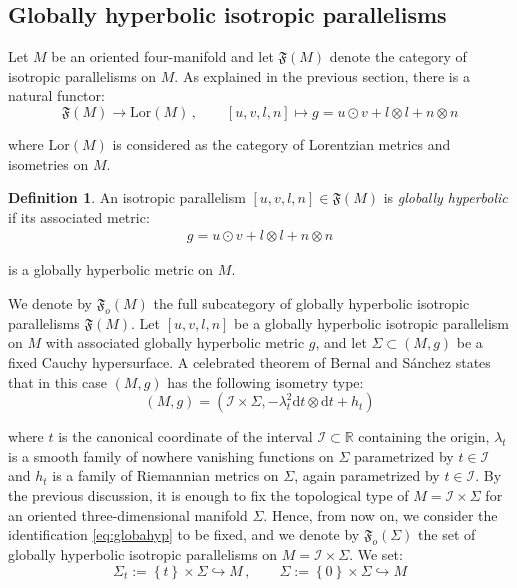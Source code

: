 \documentclass[10pt,reqno,a4paper]{amsart}
\theoremstyle{plain}
\theoremstyle{definition}
\newtheorem{definition}[thm]{Definition}
\theoremstyle{remark}
\theoremstyle{remark}
\def\dd{\mathrm{d}}
\def\cI{\mathcal{I}}
\renewcommand{\(}{ (}
\renewcommand{\)}{ )}
\begin{document}
%
%
%
%
 
 
%
%

\subsection{Globally hyperbolic isotropic parallelisms}
\label{sec:ReductionGloballyHyperbolicparallelisms}

%
%

Let $M$ be an oriented four-manifold and let $\mathfrak{F}(M)$ denote the category of isotropic parallelisms on $M$. As explained in the previous section, there is a natural functor:
\begin{equation*}
\mathfrak{F}(M) \to \mathrm{Lor}(M)\, , \qquad [u,v,l,n] \mapsto g = u\odot v + l\otimes l + n\otimes n
\end{equation*}

\noindent
where $\mathrm{Lor}(M)$ is considered as the category of Lorentzian metrics and isometries on $M$.  

\begin{definition}
\label{def:globallyhyperbolic}
An isotropic parallelism $[u,v,l,n]\in \mathfrak{F}(M)$ is \emph{globally hyperbolic} if its associated metric:
\begin{eqnarray*}
g = u\odot v + l\otimes l + n\otimes n
\end{eqnarray*}

\noindent
is a globally hyperbolic metric on $M$.
\end{definition}  

\noindent
We denote by $\mathfrak{F}_o(M)$ the full subcategory of globally hyperbolic isotropic parallelisms $\mathfrak{F}(M)$. Let $[u,v,l,n]$ be a globally hyperbolic isotropic parallelism on $M$ with associated globally hyperbolic metric $g$, and let $\Sigma \subset (M,g)$ be a fixed Cauchy hypersurface. A celebrated theorem of Bernal and S\'anchez \cite{Bernal:2003jb,Bernal:2004gm} states that in this case $(M,g)$ has the following isometry type:
\begin{equation}
\label{eq:globahyp}
(M,g) = (\cI\times \Sigma, -\lambda^2_t \dd t\otimes \dd t + h_t) 
\end{equation}

\noindent
where $t$ is the canonical coordinate of the interval $\cI \subset \mathbb{R}$ containing the origin, $\lambda_t$ is a smooth family of nowhere vanishing functions on $\Sigma$ parametrized by $t\in\cI$ and $h_t$ is a family of Riemannian metrics on $\Sigma$, again parametrized by $t\in\cI$. By the previous discussion, it is enough to fix the topological type of $M = \cI\times \Sigma$ for an oriented three-dimensional manifold $\Sigma$. Hence, from now on, we consider the identification \eqref{eq:globahyp} to be fixed, and we denote by $\mathfrak{F}_o(\Sigma)$ the set of globally hyperbolic isotropic parallelisms on $M = \cI\times \Sigma$. We set:
\begin{equation*}
\Sigma_t := \left\{ t\right\}\times \Sigma \hookrightarrow M\, , \qquad \Sigma := \left\{ 0\right\}\times \Sigma \hookrightarrow M 
\end{equation*}
\end{document}
